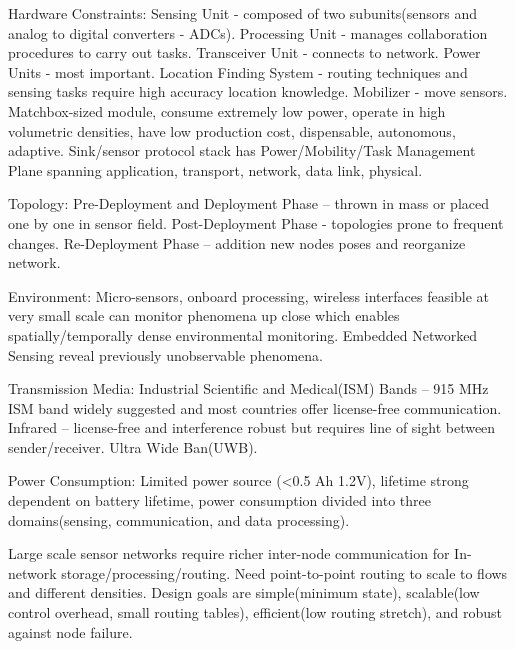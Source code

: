 \documentclass[9pt]{extarticle}
\begin{document}
\begin{multicols}{2}
Hardware Constraints: Sensing Unit - composed of two subunits(sensors and analog to digital converters - ADCs). Processing Unit - manages collaboration procedures to carry out tasks. Transceiver Unit - connects to network. Power Units  - most important. Location Finding System - routing techniques and sensing tasks require high accuracy location knowledge. Mobilizer - move sensors. Matchbox-sized module, consume extremely low power, operate in high volumetric densities, have low production cost, dispensable, autonomous, adaptive. Sink/sensor protocol stack has Power/Mobility/Task Management Plane spanning application, transport, network, data link, physical.

Topology: Pre-Deployment and Deployment Phase – thrown in mass or placed one by one in sensor field. Post-Deployment Phase - topologies prone to frequent changes. Re-Deployment Phase – addition new nodes poses and reorganize network.

Environment: Micro-sensors, onboard processing, wireless interfaces feasible at very small scale can monitor phenomena up close which enables spatially/temporally dense environmental monitoring. Embedded Networked Sensing reveal previously unobservable phenomena.

Transmission Media: Industrial Scientific and Medical(ISM) Bands – 915 MHz ISM band widely suggested and most countries offer license-free communication. Infrared – license-free and interference robust but requires line of sight between sender/receiver. Ultra Wide Ban(UWB).

Power Consumption: Limited power source (<0.5 Ah 1.2V), lifetime strong dependent on battery lifetime, power consumption divided into three domains(sensing, communication, and data processing).

Large scale sensor networks require richer inter-node communication for In-network storage/processing/routing. Need point-to-point routing to scale to flows and different densities. Design goals are simple(minimum state), scalable(low control overhead, small routing tables), efficient(low routing stretch), and robust against node failure.


\end{multicols}
\end{document}
